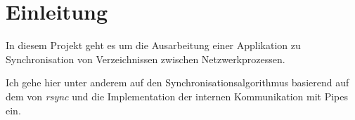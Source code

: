 \section{Einleitung}

In diesem Projekt geht es um die Ausarbeitung einer Applikation zu Synchronisation von Verzeichnissen zwischen Netzwerkprozessen.

Ich gehe hier unter anderem auf den Synchronisationsalgorithmus basierend auf dem von \textit{rsync}\cite{rsync} und die Implementation der internen Kommunikation mit Pipes ein.
